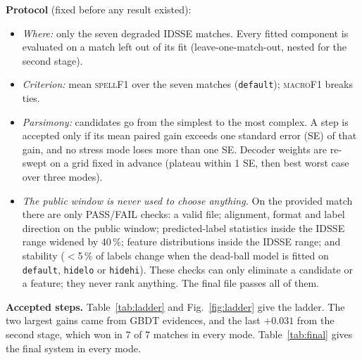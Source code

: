 \documentclass[journal]{IEEEtran}
\newcommand{\spf}{\textsc{spellF1}}
\newcommand{\mf}{\textsc{macroF1}}
\begin{document}
\textbf{Protocol} (fixed before any result existed):
\begin{itemize}
\item \emph{Where:} only the seven degraded IDSSE matches. Every fitted component is evaluated on a match left out of its fit (leave-one-match-out, nested for the second stage).
\item \emph{Criterion:} mean \spf{} over the seven matches (\texttt{default}); \mf{} breaks ties.
\item \emph{Parsimony:} candidates go from the simplest to the most complex. A step is accepted only if its mean paired gain exceeds one standard error (SE) of that gain, and no stress mode loses more than one SE. Decoder weights are re-swept on a grid fixed in advance (plateau within 1 SE, then best worst case over three modes).
\item \emph{The public window is never used to choose anything.} On the provided match there are only PASS/FAIL checks: a valid file; alignment, format and label direction on the public window; predicted-label statistics inside the IDSSE range widened by 40\,\%; feature distributions inside the IDSSE range; and stability ($<$5\,\% of labels change when the dead-ball model is fitted on \texttt{default}, \texttt{hidelo} or \texttt{hidehi}). These checks can only eliminate a candidate or a feature; they never rank anything. The final file passes all of them.
\end{itemize}

\textbf{Accepted steps.} Table~\ref{tab:ladder} and Fig.~\ref{fig:ladder} give the ladder. The two largest gains came from GBDT evidences, and the last $+0.031$ from the second stage, which won in 7 of 7 matches in every mode. Table~\ref{tab:final} gives the final system in every mode.
\end{document}
